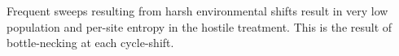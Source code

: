 Frequent sweeps resulting from harsh environmental shifts result in very low population and per-site entropy in the hostile treatment. This is the result of bottle-necking at each cycle-shift.